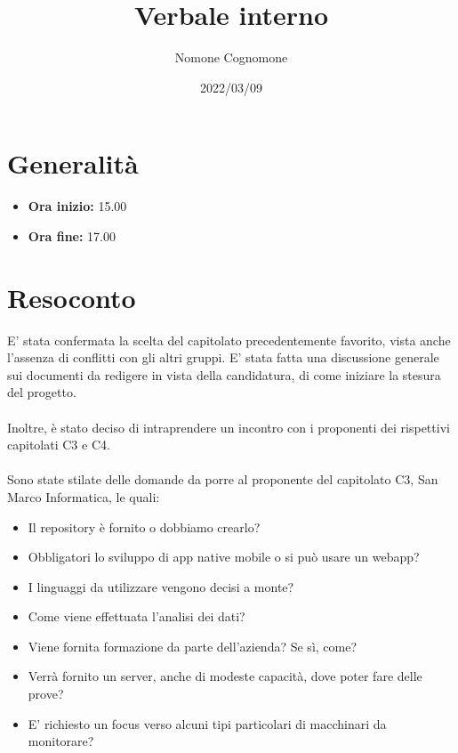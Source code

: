 \documentclass{classes/base}
\title{Verbale interno}
\date{2022/03/09}
\author{Nomone Cognomone}
\renewcommand{\maketitle}{
    
}
\begin{document}
    \maketitle

    \section{Generalità}
    \begin{itemize}
        \item \textbf{Ora inizio:} 15.00
        \item \textbf{Ora fine:} 17.00
    \end{itemize}

    \section{Resoconto}
    E' stata confermata la scelta del capitolato precedentemente favorito, vista anche l’assenza di conflitti con gli altri gruppi.
    E' stata fatta una discussione generale sui documenti da redigere in vista della candidatura, di come iniziare la stesura del progetto.
    \\\\
    Inoltre, è stato deciso di intraprendere un incontro con i proponenti dei rispettivi capitolati C3 e C4.
    \\\\
    Sono state stilate delle domande da porre al proponente del capitolato C3, San Marco Informatica, le quali:
    \begin{itemize}
        \item  Il repository è fornito o dobbiamo crearlo?
        \item  Obbligatori lo sviluppo di app native mobile o si può usare un webapp?
        \item  I linguaggi da utilizzare vengono decisi a monte? 
        \item  Come viene effettuata l'analisi dei dati?
        \item  Viene fornita formazione da parte dell'azienda? Se sì, come?
        \item  Verrà fornito un server, anche di modeste capacità, dove poter fare delle prove?
        \item  E' richiesto un focus verso alcuni tipi particolari di macchinari da monitorare?
    \end{itemize}
\end{document}
